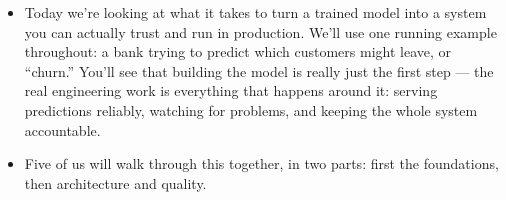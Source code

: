 \documentclass[11pt,a4paper]{article}
\begin{document}
\begin{examplebox}[title after break={SPOKEN SCRIPT --- slide 1 continued}]
\begin{itemize}
\item Today we're looking at what it takes to turn a trained model into a system you can actually trust and run in production. We'll use one running example throughout: a bank trying to predict which customers might leave, or “churn.” You'll see that building the model is really just the first step — the real engineering work is everything that happens around it: serving predictions reliably, watching for problems, and keeping the whole system accountable.
\item Five of us will walk through this together, in two parts: first the foundations, then architecture and quality.
\end{itemize}
\end{examplebox}
\par\noindent{\scriptsize\textcolor{teal!60!black}{Reading anchor: Bass, Ch. 14 · Kalinowski, Ch. 13–14}}
\clearpage
\end{document}
